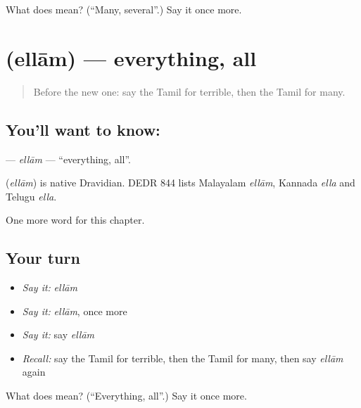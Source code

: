 \begin{tcolorbox}[breakable,colback=teal!4,colframe=teal!35!black,title={Before you move on}]
What does  mean? (\textquotedblleft{}Many, several\textquotedblright{}.) Say it once more.
\end{tcolorbox}
\section[\texorpdfstring{\ta{எல்லாம்} (ellām)}{எல்லாம் (ellām)}]{ (ellām) — everything, all}

\label{lesson:TA-C181-ellam}



\begin{quote}
Before the new one: say the Tamil for terrible, then the Tamil for many.
\end{quote}

\subsection*{You'll want to know: }
\textbf{} — \emph{ellām} — \textquotedblleft{}everything, all\textquotedblright{}.

\begin{cousinweb}
\textbf{} (\emph{ellām}) is native Dravidian. DEDR 844 lists Malayalam \emph{ellām}, Kannada \emph{ella} and Telugu \emph{ella}.
\end{cousinweb}

\begin{grammarlens}[title={What you've built}]
One more word for this chapter.
\end{grammarlens}

\subsection*{Your turn}
\begin{itemize}
\raggedright
  \item \emph{Say it:} \emph{ellām}
  \item \emph{Say it:} \emph{ellām}, once more
  \item \emph{Say it:} say \emph{ellām}
  \item \emph{Recall:} say the Tamil for terrible, then the Tamil for many, then say \emph{ellām} again
\end{itemize}

\begin{tcolorbox}[breakable,colback=teal!4,colframe=teal!35!black,title={Before you move on}]
What does  mean? (\textquotedblleft{}Everything, all\textquotedblright{}.) Say it once more.
\end{tcolorbox}
